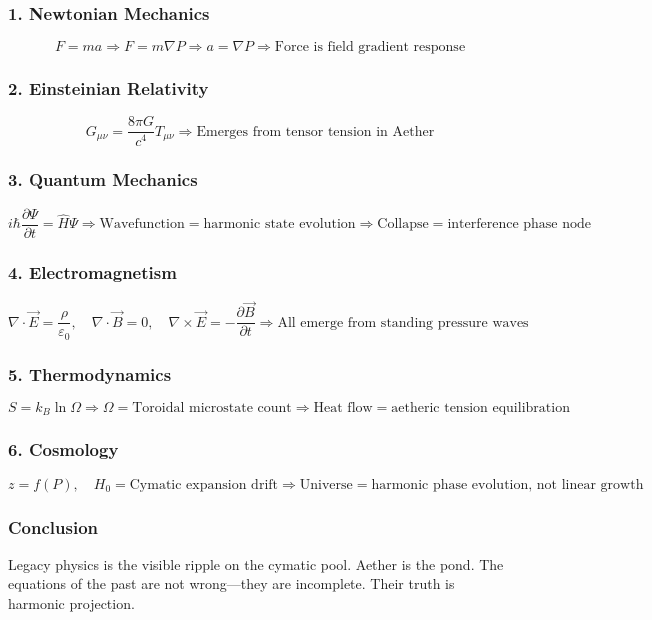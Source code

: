 \subsubsection*{1. Newtonian Mechanics}
\[
F = m a \Rightarrow F = m \nabla P \Rightarrow a = \nabla P \Rightarrow \text{Force is field gradient response}
\]

\subsubsection*{2. Einsteinian Relativity}
\[
G_{\mu \nu} = \frac{8 \pi G}{c^4} T_{\mu \nu} \Rightarrow \text{Emerges from tensor tension in Aether}
\]

\subsubsection*{3. Quantum Mechanics}
\[
i \hbar \frac{\partial \Psi}{\partial t} = \hat{H} \Psi \Rightarrow \text{Wavefunction} = \text{harmonic state evolution} \Rightarrow \text{Collapse} = \text{interference phase node}
\]

\subsubsection*{4. Electromagnetism}
\[
\nabla \cdot \vec{E} = \frac{\rho}{\varepsilon_0}, \quad \nabla \cdot \vec{B} = 0, \quad \nabla \times \vec{E} = -\frac{\partial \vec{B}}{\partial t} \Rightarrow \text{All emerge from standing pressure waves}
\]

\subsubsection*{5. Thermodynamics}
\[
S = k_B \ln \Omega \Rightarrow \Omega = \text{Toroidal microstate count} \Rightarrow \text{Heat flow} = \text{aetheric tension equilibration}
\]

\subsubsection*{6. Cosmology}
\[
z = f(P), \quad H_0 = \text{Cymatic expansion drift} \Rightarrow \text{Universe} = \text{harmonic phase evolution, not linear growth}
\]

\subsubsection*{Conclusion}
Legacy physics is the visible ripple on the cymatic pool. Aether is the pond. The equations of the past are not wrong—they are incomplete. Their truth is harmonic projection.

